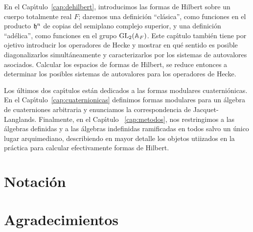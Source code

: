 En el Cap\'{\i}tulo~\ref{cap:dehilbert}, introducimos las formas de Hilbert
sobre un cuerpo totalmente real $F$; daremos una definici\'{o}n
``cl\'{a}sica'', como funciones en el producto $\mathfrak{h}^{n}$ de copias del
semiplano complejo superior, y una definici\'{o}n ``ad\'{e}lica'', como
funciones en el grupo $\mathrm{GL}_{2}(\mathbb{A}_{F})$. Este cap\'{\i}tulo tambi\'{e}n
tiene por ojetivo introducir los operadores de Hecke y mostrar en qu\'{e}
sentido es posible diagonalizarlos simult\'{a}neamente y caracterizarlos por
los sistemas de autovalores asociados. Calcular los espacios de formas
de Hilbert, se reduce entonces a determinar los posibles sistemas de
autovalores para los operadores de Hecke.

Los \'{u}ltimos dos cap\'{\i}tulos est\'{a}n dedicados a las formas modulares
cuaterni\'{o}nicas. En el Cap\'{\i}tulo~\ref{cap:cuaternionicas} definimos
formas modulares para un \'{a}lgebra de cuaterniones arbitraria y enunciamos la
correspondencia de Jacquet-Langlands. Finalmente, en el Cap\'{\i}tulo~%
\ref{cap:metodos}, nos restringimos a las \'{a}lgebras definidas y a las
\'{a}lgebras indefinidas ramificadas en todos salvo un \'{u}nico lugar
arquimediano, describiendo en mayor detalle los objetos utiizados en la
pr\'{a}ctica para calcular efectivamente formas de Hilbert.

\section*{Notaci\'{o}n}


\section*{Agradecimientos}

